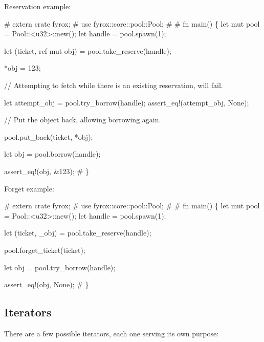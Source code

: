 \documentclass[
]{book}
\newenvironment{Shaded}{\begin{snugshade}}{\end{snugshade}}
\newcommand{\NormalTok}[1]{#1}
\theoremstyle{definition}
\theoremstyle{definition}
\theoremstyle{definition}
\theoremstyle{definition}
\theoremstyle{remark}
\begin{document}
Reservation example:

\begin{Shaded}
\begin{Highlighting}[]
\NormalTok{\# extern crate fyrox;}
\NormalTok{\# use fyrox::core::pool::Pool;}
\NormalTok{\#}
\NormalTok{\# fn main() \{}
\NormalTok{let mut pool = Pool::\textless{}u32\textgreater{}::new();}
\NormalTok{let handle = pool.spawn(1);}

\NormalTok{let (ticket, ref mut obj) = pool.take\_reserve(handle);}

\NormalTok{*obj = 123;}

\NormalTok{// Attempting to fetch while there is an existing reservation, will fail.}

\NormalTok{let attempt\_obj = pool.try\_borrow(handle);}
\NormalTok{assert\_eq!(attempt\_obj, None);}

\NormalTok{// Put the object back, allowing borrowing again.}

\NormalTok{pool.put\_back(ticket, *obj);}

\NormalTok{let obj = pool.borrow(handle);}

\NormalTok{assert\_eq!(obj, \&123);}
\NormalTok{\# \}}
\end{Highlighting}
\end{Shaded}

Forget example:

\begin{Shaded}
\begin{Highlighting}[]
\NormalTok{\# extern crate fyrox;}
\NormalTok{\# use fyrox::core::pool::Pool;}
\NormalTok{\#}
\NormalTok{\# fn main() \{}
\NormalTok{let mut pool = Pool::\textless{}u32\textgreater{}::new();}
\NormalTok{let handle = pool.spawn(1);}

\NormalTok{let (ticket, \_obj) = pool.take\_reserve(handle);}

\NormalTok{pool.forget\_ticket(ticket);}

\NormalTok{let obj = pool.try\_borrow(handle);}

\NormalTok{assert\_eq!(obj, None);}
\NormalTok{\# \}}
\end{Highlighting}
\end{Shaded}

\subsection{Iterators}\label{iterators}

There are a few possible iterators, each one serving its own purpose:
\end{document}
